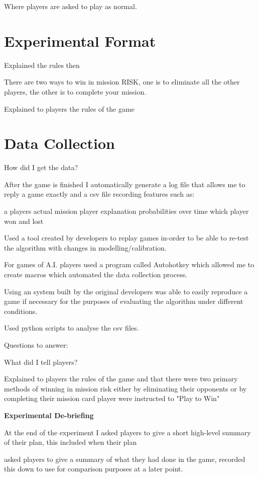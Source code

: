 \documentclass[parskip]{cs4rep}
\begin{document}
Where players are asked to play as normal.

\section{Experimental Format}

Explained the rules then

There are two ways to win in mission RISK, one is to eliminate all the other players, the other is to complete your mission.

Explained to players the rules of the game 

\section{Data Collection}

How did I get the data?

After the game is finished I automatically generate a log file that allows me to reply a game exactly and a csv file recording features such as:

a players actual mission
player explanation probabilities over time
which player won and lost

Used a tool created by developers to replay games in-order to be able to re-test the algorithm with changes in modelling/calibration.

For games of A.I. players used a program called Autohotkey which allowed me to create macros which automated the data collection process.

Using an system built by the original developers was able to easily reproduce a game if necessary for the purposes of evaluating the algorithm under different conditions.

Used python scripts to analyse the csv files.

Questions to answer:

What did I tell players?

Explained to players the rules of the game and that there were two primary methods of winning in mission risk either by eliminating their opponents or by completing their mission card player were instructed to "Play to Win"

\textbf{Experimental De-briefing}

At the end of the experiment I asked players to give a short high-level summary of their plan, this included when their plan

asked players to give a summary of what they had done in the game, recorded this down to use for comparison purposes at a later point.
\end{document}
